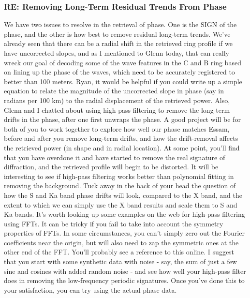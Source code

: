 \documentclass[crop=false,class=article,oneside]{standalone}
\begin{document}
\subsubsection{\footnotesize RE: Removing Long-Term Residual Trends From Phase}
We have two issues to resolve in the retrieval of phase. One is the SIGN of the phase, and the other is how best to remove residual long-term trends. We've already seen that there can be a radial shift in the retrieved ring profile if we have uncorrected slopes, and as I mentioned to Glenn today, that can really wreck our goal of decoding some of the wave features in the C and B ring based on lining up the phase of the waves, which need to be accurately registered to better than 100 meters. Ryan, it would be helpful if you could write up a simple equation to relate the magnitude of the uncorrected slope in phase (say in radians per 100 km) to the radial displacement of the retrieved power. Also, Glenn and I chatted about using high-pass filtering to remove the long-term drifts in the phase, after one first unwraps the phase. A good project will be for both of you to work together to explore how well our phase matches Essam, before and after you remove long-term drifts, and how the drift-removal affects the retrieved power (in shape and in radial location). At some point, you'll find that you have overdone it and have started to remove the real signature of diffraction, and the retrieved profile will begin to be distorted. It will be interesting to see if high-pass filtering works better than polynomial fitting in removing the background. Tuck away in the back of your head the question of how the S and Ka band phase drifts will look, compared to the X band, and the extent to which we can simply use the X band results and scale them to S and Ka bands. It's worth looking up some examples on the web for high-pass filtering using FFTs. It can be tricky if you fail to take into account the symmetry properties of FFTs. In some circumstances, you can't simply zero out the Fourier coefficients near the origin, but will also need to zap the symmetric ones at the other end of the FFT. You'll probably see a reference to this online. I suggest that you start with some synthetic data with noise - say, the sum of just a few sine and cosines with added random noise - and see how well your high-pass filter does in removing the low-frequency periodic signatures. Once you've done this to your satisfaction, you can try using the actual phase data.
\end{document}
